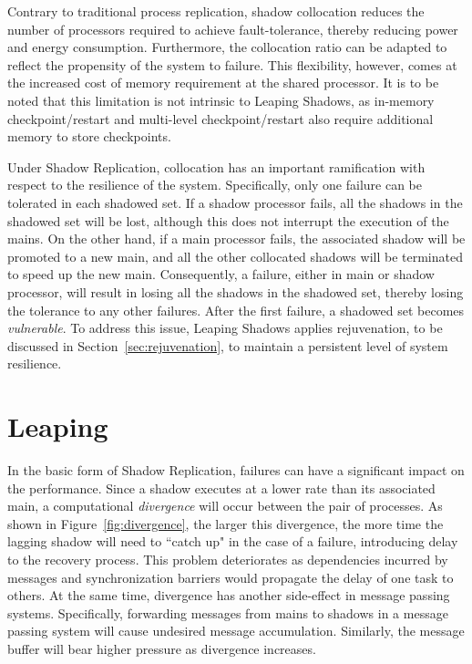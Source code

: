 Contrary to traditional process replication, shadow collocation reduces
the number of processors required to achieve fault-tolerance,
thereby reducing power and energy consumption. Furthermore, the collocation ratio can be adapted to reflect the
propensity of the system to failure. This flexibility, however,
comes at the increased cost of memory requirement at the
shared processor. It is to be noted that this limitation is not
intrinsic to Leaping Shadows, as in-memory checkpoint/restart and multi-level checkpoint/restart also require additional memory to store checkpoints.

Under Shadow Replication, collocation has an important ramification with respect to the resilience of the system. Specifically, only
one failure can be tolerated in each shadowed set. If a shadow processor fails, all the shadows in the 
shadowed set will be lost, although this does not interrupt the execution of the mains. 
On the other hand, if a main processor fails, the associated shadow will be promoted to a new main, and all 
the other collocated shadows will be terminated to speed up the new main.
Consequently, a failure, either in main or shadow processor, will result in losing all the shadows in the shadowed set, thereby losing the tolerance to any other failures. After the first failure, a shadowed set becomes \emph{vulnerable}. To address this issue, Leaping Shadows applies rejuvenation, to be discussed in Section~\ref{sec:rejuvenation}, to maintain a persistent level of system resilience.



\section{Leaping}
\label{sec:leaping_shadows}

In the basic form of Shadow Replication, failures can
have a significant impact on the performance. Since a
shadow executes at a lower rate than its associated main,
a computational \textit{divergence} will occur between the pair of processes. As shown in Figure~\ref{fig:divergence}, the larger this divergence, the more time the lagging shadow will need to ``catch up" in the case of a failure, introducing delay to the recovery process. 
This problem deteriorates as dependencies incurred by messages and synchronization barriers would propagate the delay of one task to others. 
At the same time, divergence has another side-effect in message passing systems. Specifically, forwarding messages from mains to shadows in a message passing system will cause undesired message accumulation. Similarly, the message buffer will bear higher pressure as divergence increases. 

